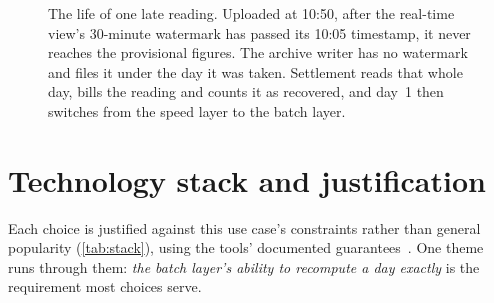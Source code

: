 \documentclass[11pt,a4paper]{article}
\begin{document}
\begin{figure}[!htbp]
\caption{The life of one late reading. Uploaded at 10:50, after the real-time view's
30-minute watermark has passed its 10:05 timestamp, it never reaches the provisional
figures. The archive writer has no watermark and files it under the day it was taken.
Settlement reads that whole day, bills the reading and counts it as recovered, and day~1
then switches from the speed layer to the batch layer.}
\label{fig:late}
\end{figure}

\section{Technology stack and justification}
\label{sec:stack}

Each choice is justified against this use case's constraints rather than general
popularity (\cref{tab:stack}), using the tools' documented guarantees~\cite{kafka,spark,airflow}. One theme runs through them: \emph{the batch layer's
ability to recompute a day exactly} is the requirement most choices serve.
\end{document}
